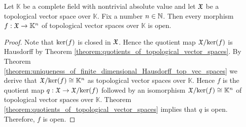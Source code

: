 \documentclass[10pt]{amsart}
\begin{document}
\begin{corollary}\label{corollary:continuous_map_to_standard_finite_dimensional_is_open}
	Let $\mathbb{K}$ be a complete field with nontrivial absolute value and let ${\mathfrak X}$ be a topological vector space over $\mathbb{K}$. Fix a number $n \in {\mathbb N}$. Then every morphism $f:{\mathfrak X}\rightarrow \mathbb{K}^n$ of topological vector spaces over $\mathbb{K}$ is open.
\end{corollary}
\begin{proof}
	Note that $\mathrm{ker}(f)$ is closed in ${\mathfrak X}$. Hence the quotient map ${\mathfrak X}/\mathrm{ker}(f)$ is Hausdorff by Theorem \ref{theorem:quotients_of_topological_vector_spaces}. By Theorem \ref{theorem:uniqueness_of_finite_dimensional_Hausdorff_top_vec_spaces} we derive that ${\mathfrak X}/\mathrm{ker}(f) \cong \mathbb{K}^n$ as topological vector spaces over $\mathbb{K}$. Hence $f$ is the quotient map $q:{\mathfrak X}\rightarrow {\mathfrak X}/\mathrm{ker}(f)$ followed by an isomorphism ${\mathfrak X}/\mathrm{ker}(f)\cong \mathbb{K}^n$ of topological vector spaces over $\mathbb{K}$. Theorem \ref{theorem:quotients_of_topological_vector_spaces} implies that $q$ is open. Therefore, $f$ is open.
\end{proof}
\end{document}
